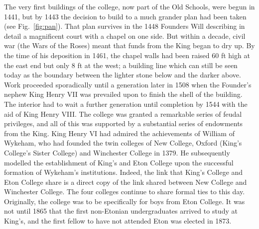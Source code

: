 \documentclass{report}
\begin{document}

The very first buildings of the college, now part of the Old Schools, were begun in 1441, but by 1443 the decision to build to a much grander plan had been taken (see Fig.~\ref{fig:pan}). That plan survives in the 1448 Founders Will describing in detail a magnificent court with a chapel on one side. But within a decade, civil war (the Wars of the Roses) meant that funds from the King began to dry up. By the time of his deposition in 1461, the chapel walls had been raised 60 ft high at the east end but only 8 ft at the west; a building line which can still be seen today as the boundary between the lighter stone below and the darker above. Work proceeded sporadically until a generation later in 1508 when the Founder's nephew King Henry VII was prevailed upon to finish the shell of the building. The interior had to wait a further generation until completion by 1544 with the aid of King Henry VIII. The college was granted a remarkable series of feudal privileges, and all of this was supported by a substantial series of endowments from the King. King Henry VI had admired the achievements of William of Wykeham, who had founded the twin colleges of New College, Oxford (King's College's Sister College) and Winchester College in 1379. He subsequently modelled the establishment of King's and Eton College upon the successful formation of Wykeham's institutions. Indeed, the link that King's College and Eton College share is a direct copy of the link shared between New College and Winchester College. The four colleges continue to share formal ties to this day. Originally, the college was to be specifically for boys from Eton College. It was not until 1865 that the first non-Etonian undergraduates arrived to study at King's, and the first fellow to have not attended Eton was elected in 1873. \\

\newpage


% 
\end{document}
